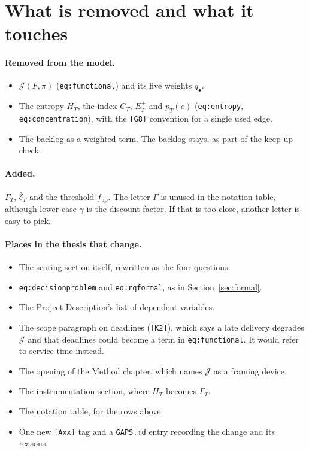\documentclass[11pt,a4paper]{article}
\begin{document}
\section{What is removed and what it touches}
\label{sec:touches}

\paragraph{Removed from the model.}
\begin{itemize}[nosep]
  \item $\mathcal{J}(F,\pi)$ (\texttt{eq:functional}) and its five weights
    $q_\bullet$.
  \item The entropy $H_T$, the index $C_T$, $E^{+}_T$ and $p_T(e)$
    (\texttt{eq:entropy}, \texttt{eq:concentration}), with the
    \texttt{[G8]} convention for a single used edge.
  \item The backlog as a weighted term. The backlog stays, as part of the
    keep-up check.
\end{itemize}

\paragraph{Added.} $\Gamma_T$, $\bar\delta_T$ and the threshold
$f_{\mathrm{up}}$. The letter $\Gamma$ is unused in the notation table,
although lower-case $\gamma$ is the discount factor. If that is too close,
another letter is easy to pick.

\paragraph{Places in the thesis that change.}
\begin{itemize}[nosep]
  \item The scoring section itself, rewritten as the four questions.
  \item \texttt{eq:decisionproblem} and \texttt{eq:rqformal}, as in
    Section~\ref{sec:formal}.
  \item The Project Description's list of dependent variables.
  \item The scope paragraph on deadlines (\texttt{[K2]}), which says a late
    delivery degrades $\mathcal{J}$ and that deadlines could become a term
    in \texttt{eq:functional}. It would refer to service time instead.
  \item The opening of the Method chapter, which names $\mathcal{J}$ as a
    framing device.
  \item The instrumentation section, where $H_T$ becomes $\Gamma_T$.
  \item The notation table, for the rows above.
  \item One new \texttt{[Axx]} tag and a \texttt{GAPS.md} entry recording
    the change and its reasons.
\end{itemize}
\end{document}
